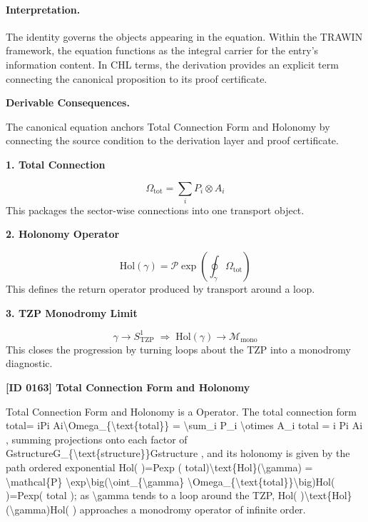 \paragraph{Interpretation.}
The identity governs the objects appearing in the equation. Within the TRAWIN framework, the equation functions as the integral carrier for the entry’s information content. In CHL terms, the derivation provides an explicit term connecting the canonical proposition to its proof certificate.

\par\vspace{0.35em}
\noindent\textbf{Derivable Consequences.}\quad
\begingroup
\footnotesize
\raggedright
The canonical equation anchors Total Connection Form and Holonomy by connecting the source condition to the derivation layer and proof certificate.
\par\endgroup

\noindent\textbf{1. Total Connection}\par
\[
\Omega_{\mathrm{tot}}=\sum_i P_i\otimes A_i
\]
\noindent This packages the sector-wise connections into one transport object.\par
\noindent\textbf{2. Holonomy Operator}\par
\[
\mathrm{Hol}(\gamma)=\mathcal{P}\exp\!\left(\oint_{\gamma}\Omega_{\mathrm{tot}}\right)
\]
\noindent This defines the return operator produced by transport around a loop.\par
\noindent\textbf{3. TZP Monodromy Limit}\par
\[
\gamma\to S^1_{\mathrm{TZP}}
\;\Longrightarrow\;
\mathrm{Hol}(\gamma)\to \mathcal{M}_{\mathrm{mono}}
\]
\noindent This closes the progression by turning loops about the TZP into a monodromy diagnostic.\par

\clearpage
\noindent\textbf{[ID 0163] Total Connection Form and Holonomy}\par
\vspace{0.35em}
\begingroup\small
{}
Total Connection Form and Holonomy is a Operator. The total connection form  total= iPi Ai\textbackslash{}Omega\_\{\textbackslash{}text\{total\}\} = \textbackslash{}sum\_i P\_i \textbackslash{}otimes A\_i total = i Pi  Ai , summing projections onto each factor of GstructureG\_\{\textbackslash{}text\{structure\}\}Gstructure , and its holonomy is given by the path ordered exponential Hol( )=Pexp (   total)\textbackslash{}text\{Hol\}(\textbackslash{}gamma) = \textbackslash{}mathcal\{P\} \textbackslash{}exp\textbackslash{}big(\textbackslash{}oint\_\{\textbackslash{}gamma\} \textbackslash{}Omega\_\{\textbackslash{}text\{total\}\}\textbackslash{}big)Hol( )=Pexp(    total ); as  \textbackslash{}gamma  tends to a loop around the TZP, Hol( )\textbackslash{}text\{Hol\}(\textbackslash{}gamma)Hol( ) approaches a monodromy operator of infinite order.

